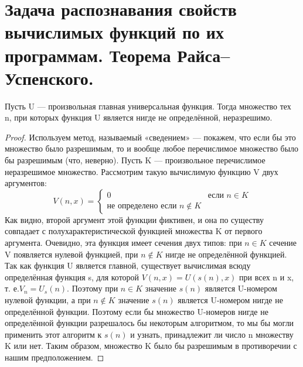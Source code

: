 \section{Задача распознавания свойств вычислимых функций по их программам. Теорема Райса–Успенского.}

\begin{theorem}
Пусть U — произвольная главная универсальная функция. Тогда множество тех n, при которых функция U является нигде не определённой, неразрешимо.
\end{theorem}
\begin{proof}
Используем метод, называемый «сведением» — покажем, что если бы это множество было разрешимым, то и вообще любое перечислимое множество было бы разрешимым (что, неверно). Пусть K — произвольное перечислимое неразрешимое множество. Рассмотрим такую вычислимую функцию V двух аргументов:
\begin{equation*}
V(n,x) = 
 \begin{cases}
   0 &\text{если $n \in K$}\\
   \text{не определено если $n \notin K$}
 \end{cases}
\end{equation*} 
Как видно, второй аргумент этой функции фиктивен, и она по существу совпадает с полухарактеристической функцией множества K от первого аргумента. Очевидно, эта функция имеет сечения двух типов: при $n \in K$ сечение V появляется нулевой функцией, при $n \notin K$ нигде не определённой функцией. Так как функция U является главной, существует вычислимая всюду определённая функция s, для которой $V(n,x) = U(s(n),x)$ при всех n и x, т. е.$V_n = U_s(n)$. Поэтому при $n \in K$ значение $s(n)$ является U-номером нулевой функции, а при $n \notin K$ значение $s(n)$ является U-номером нигде не определённой функции. Поэтому если бы множество U-номеров нигде не определённой функции разрешалось бы некоторым алгоритмом, то мы бы могли применить этот алгоритм к $s(n)$ и узнать, принадлежит ли число n множеству K или нет. Таким образом, множество K было бы разрешимым в противоречии с нашим предположением.
\end{proof}

